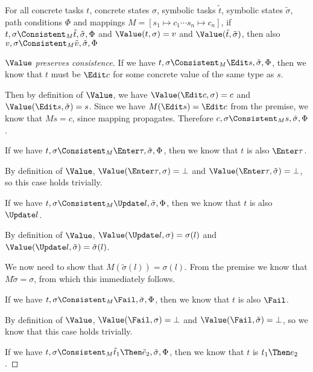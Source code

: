 \begin{lemma}
  \label{lem:valpres}
  For all concrete tasks $t$, concrete states $\sigma$, symbolic tasks $\tilde{t}$, symbolic states $\tilde{\sigma}$, path conditions $\Phi$ and mappings $M=[s_1\mapsto c_1\cdots s_n\mapsto c_n]$,
  if $t,\sigma\Consistent_M\tilde{t},\tilde{\sigma},\Phi$ and $\Value(t,\sigma)=v$ and $\Value(\tilde{t},\tilde{\sigma})$,
  then also $v,\sigma\Consistent_M\tilde{v},\tilde{\sigma},\Phi$
\end{lemma}

\begin{proof}[$\Value$ preserves consistence]

    {
    If we have $t,\sigma\Consistent_M\Edit s,\tilde{\sigma},\Phi$, then we know that $t$ must be $\Edit c$ for some concrete value of the same type as $s$.

    Then by definition of $\Value$, we have $\Value(\Edit c,\sigma)=c$ and $\Value(\Edit s,\tilde{\sigma})=s$.
    Since we have $M(\Edit s)=\Edit c$ from the premise, we know that $M s = c$, since mapping propagates.
    Therefore $c,\sigma\Consistent_M s,\tilde{\sigma},\Phi$.
    }

    {
    If we have $t,\sigma\Consistent_M\Enter \tau,\tilde{\sigma},\Phi$, then we know that $t$ is also $\Enter\tau$.

    By definition of $\Value$, $\Value(\Enter \tau,\sigma)=\bot$ and $\Value(\Enter\tau,\tilde{\sigma})=\bot$,
    so this case holds trivially.
    }

    {
    If we have $t,\sigma\Consistent_M\Update l,\tilde{\sigma},\Phi$, then we know that $t$ is also $\Update l$.

    By definition of $\Value$, $\Value(\Update l,\sigma)=\sigma(l)$ and $\Value(\Update l,\tilde{\sigma})=\tilde{\sigma}(l)$.

    We now need to show that $M(\tilde{\sigma}(l))=\sigma(l)$. From the premise we know that $M\tilde{\sigma}=\sigma$, from which this immediately follows.
    }

    {
    If we have $t,\sigma\Consistent_M\Fail,\tilde{\sigma},\Phi$, then we know that $t$ is also $\Fail$.

    By definition of $\Value$, $\Value(\Fail,\sigma)=\bot$ and $\Value(\Fail,\tilde{\sigma})=\bot$, so we know that this case holds trivially.
    }

    {
    If we have $t,\sigma\Consistent_M\tilde{t}_1\Then \tilde{e}_2,\tilde{\sigma},\Phi$, then we know that $t$ is $t_1\Then e_2$.

}
\end{proof}
